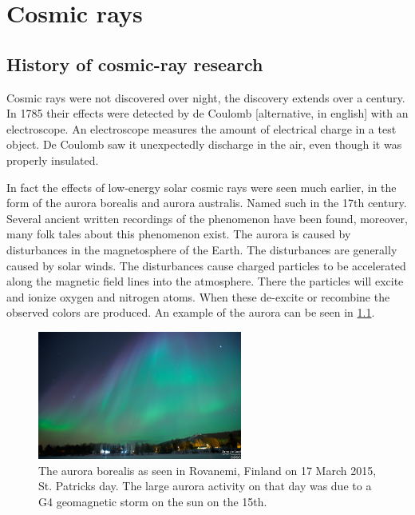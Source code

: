 \chapter{Cosmic rays}
\label{ch:cosmic-rays}


\section{History of cosmic-ray research}

Cosmic rays were not discovered over night, the discovery extends over a century. In 1785 their effects were detected by de Coulomb \cite{coulomb1785electroscope} [alternative, in english] with an electroscope. An electroscope measures the amount of electrical charge in a test object. De Coulomb saw it unexpectedly discharge in the air, even though it was properly insulated.

In fact the effects of low-energy solar cosmic rays were seen much earlier, in the form of the aurora borealis and aurora australis. Named such in the 17th century. Several ancient written recordings of the phenomenon \cite{stephenson2004aurora} have been found, moreover, many folk tales about this phenomenon exist. The aurora is caused by disturbances in the magnetosphere of the Earth. The disturbances are generally caused by solar winds. The disturbances cause charged particles to be accelerated along the magnetic field lines into the atmosphere. There the particles will excite and ionize oxygen and nitrogen atoms. When these de-excite or recombine the observed colors are produced. An example of the aurora can be seen in \cref{fig:aurora}.

\begin{figure}
    \centering
    \includegraphics[width=0.6\textwidth]{plots/cosmic-rays/aurora.png}
    \caption{The aurora borealis as seen in Rovanemi, Finland on 17 March 2015, St. Patricks day. The large aurora activity on that day was due to a G4 geomagnetic storm on the sun on the 15th.}
    \label{fig:aurora}
\end{figure}

